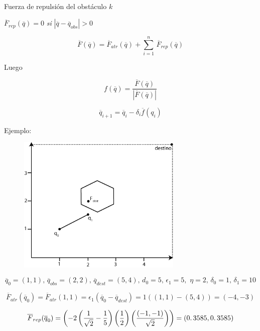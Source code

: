 \paragraph{}
Fuerza de repulsión del obstáculo $k$

\begin{center}
$\overline{F}_{rep}(\overline{q}) = 0$ \textit{ si } $\left| \overline{q} - \overline{q}_{obs}\right| > 0$
\end{center}

$$\overline{F}(\overline{q}) = \overline{F}_{atr}(\overline{q}) + \displaystyle \sum_{i = 1}^{n} \, \overline{F}_{rep}(\overline{q})$$

Luego

$$f(\overline{q}) = \dfrac{\overline{F}(\overline{q})}{\left|  \overline{F}(\overline{q}) \right| }$$


$$\overline{q}_{i + 1} = \overline{q}_{i} - \delta_{i} \overline{f}(q_{i})$$

Ejemplo:

\begin{figure}[h!]
	\centering
	\includegraphics[width=0.7\textwidth]{images/img16.png}
	\label{figura16}
\end{figure}

$$\overline{q}_{0} = (1,1),\, \overline{q}_{obs} = (2,2),\, \overline{q}_{dest} = (5,4),\, d_{0} = 5,\, \epsilon_{1} = 5, \,\, \eta = 2,\, \delta_{0} = 1,\, \delta_{1} = 10$$

$$\overline{F}_{atr}(\overline{q}_{0}) = \overline{F}_{atr}(1,1) = \epsilon_{1}(\overline{q}_{0} - \overline{q}_{dest}) = 1((1,1) - (5,4)) = (-4,-3)$$

$$\overline{F}_{rep}(\overline{q}_{0}) = \left( -2\left( \dfrac{1}{\sqrt{2}} - \dfrac{1}{5} \right) \left( \dfrac{1}{2} \right)  \left( \dfrac{(-1,-1)}{\sqrt{2}} \right) \right) = (0\ldotp3585,0\ldotp3585)$$

